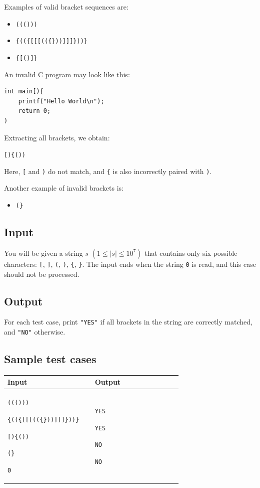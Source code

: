 \documentclass[11pt,a4paper]{article}
\newenvironment{sample}[2]{
  \begin{tcolorbox}[title=Sample case \##1, colback=white, colframe=black, sharp corners,
    fonttitle=\bfseries, breakable]
    \begin{tabular}{|p{0.45\linewidth}|p{0.45\linewidth}|}
      \hline
      \textbf{Input} & \textbf{Output} \\
      \hline
      }{\\ \hline
    \end{tabular}
  \end{tcolorbox}
}
\begin{document}
Examples of valid bracket sequences are:

\begin{itemize}
  \item \texttt{((()))}
  \item \texttt{\{((\{[[[((\{\}))]]]\}))\}}
  \item \texttt{\{[()]\}}
\end{itemize}

An invalid C program may look like this:

\begin{verbatim}
int main[){
    printf("Hello World\n");
    return 0;
)
\end{verbatim}

Extracting all brackets, we obtain:

\texttt{[)\{())}

Here, \texttt{[} and \texttt{)} do not match, and \texttt{\{} is also incorrectly paired with \texttt{)}.

Another example of invalid brackets is:

\begin{itemize}
  \item \texttt{(\}}
\end{itemize}

\subsection*{Input}

You will be given a string \(s\) \((1 \leq |s| \leq 10^7)\) that contains only six possible characters: \texttt{[}, \texttt{]}, \texttt{(}, \texttt{)}, \texttt{\{}, \texttt{\}}.  
The input ends when the string \texttt{0} is read, and this case should not be processed.

\subsection*{Output}

For each test case, print \texttt{"YES"} if all brackets in the string are correctly matched, and \texttt{"NO"} otherwise.

\subsection*{Sample test cases}

\begin{sample}{1}{}
  \texttt{((()))}

  \texttt{\{((\{[[[((\{\}))]]]\}))\}}

  \texttt{[)\{())}

  \texttt{(\}}

  \texttt{0}

  &
  \texttt{YES}

  \texttt{YES}

  \texttt{NO}

  \texttt{NO}

\end{sample}
\end{document}
